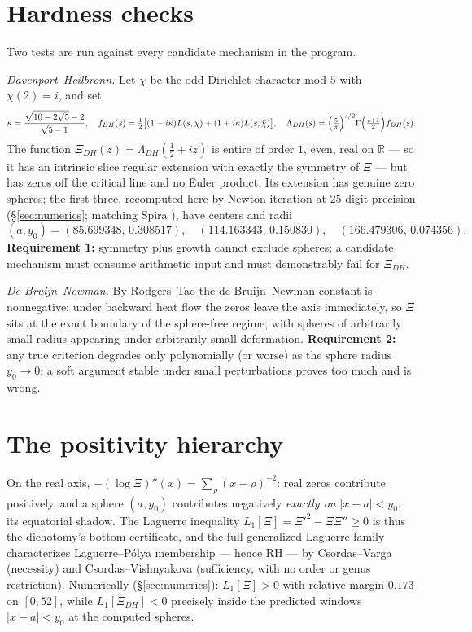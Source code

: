 \documentclass[11pt]{amsart}
\theoremstyle{plain}
\theoremstyle{definition}
\theoremstyle{remark}
\newcommand{\RR}{\mathbb{R}}
\begin{document}
\section{Hardness checks}\label{sec:hardness}

Two tests are run against every candidate mechanism in the program.

\emph{Davenport--Heilbronn.} Let $\chi$ be the odd Dirichlet character mod $5$ with $\chi(2)=i$,
and set
\[
\kappa=\frac{\sqrt{10-2\sqrt5}-2}{\sqrt5-1},\quad
f_{DH}(s)=\tfrac12\bigl[(1-i\kappa)L(s,\chi)+(1+i\kappa)L(s,\bar\chi)\bigr],\quad
\Lambda_{DH}(s)=\Bigl(\tfrac{5}{\pi}\Bigr)^{s/2}\Gamma\Bigl(\tfrac{s+1}{2}\Bigr)f_{DH}(s).
\]
The function $\Xi_{DH}(z)=\Lambda_{DH}(\tfrac12+iz)$
\cite{DavenportHeilbronn1936a,DavenportHeilbronn1936b,Titchmarsh1986} is entire of order $1$, even,
real on $\RR$ --- so it has an intrinsic slice regular extension with exactly the symmetry of $\Xi$
--- but has zeros off the critical line and no Euler product. Its extension has genuine zero
spheres; the first three, recomputed here by Newton iteration at $25$-digit precision
(\S\ref{sec:numerics}; matching Spira \cite{Spira1994}), have centers and radii
\begin{equation}\label{eq:DHspheres}
(a,y_0)=(85.699348,\,0.308517),\quad(114.163343,\,0.150830),\quad(166.479306,\,0.074356).
\end{equation}
\textbf{Requirement 1:} symmetry plus growth cannot exclude spheres; a candidate mechanism must
consume arithmetic input and must demonstrably fail for $\Xi_{DH}$.

\emph{De Bruijn--Newman.} By Rodgers--Tao \cite{RodgersTao2020} the de Bruijn--Newman constant is
nonnegative: under backward heat flow the zeros leave the axis immediately, so $\Xi$ sits at the
exact boundary of the sphere-free regime, with spheres of arbitrarily small radius appearing under
arbitrarily small deformation. \textbf{Requirement 2:} any true criterion degrades only
polynomially (or worse) as the sphere radius $y_0\to0$; a soft argument stable under small
perturbations proves too much and is wrong.

\section{The positivity hierarchy}\label{sec:positivity}

On the real axis, $-(\log\Xi)''(x)=\sum_\rho(x-\rho)^{-2}$: real zeros contribute positively, and a
sphere $(a,y_0)$ contributes negatively \emph{exactly on} $|x-a|<y_0$, its equatorial shadow. The
Laguerre inequality $L_1[\Xi]=\Xi'^2-\Xi\Xi''\ge0$ is thus the dichotomy's bottom certificate, and
the full generalized Laguerre family characterizes Laguerre--P\'olya membership --- hence RH ---
by Csordas--Varga \cite[Thm.~2.9]{CsordasVarga1990} (necessity) and Csordas--Vishnyakova
\cite[Thm.~2.3]{CsordasVishnyakova2013} (sufficiency, with no order or genus restriction).
Numerically (\S\ref{sec:numerics}): $L_1[\Xi]>0$ with relative margin $0.173$ on $[0,52]$, while
$L_1[\Xi_{DH}]<0$ precisely inside the predicted windows $|x-a|<y_0$ at the computed spheres.
\end{document}
